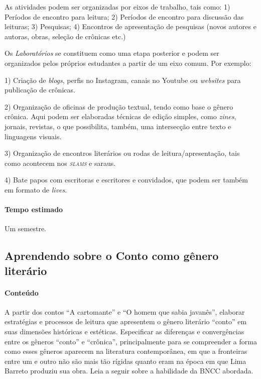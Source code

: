 \documentclass[11pt]{extarticle}
\begin{document}
As atividades podem ser organizadas por eixos de trabalho, tais como: 1)
Períodos de encontro para leitura; 2) Períodos de encontro para
discussão das leituras; 3) Pesquisas; 4) Encontros de apresentação de
pesquisas (novos autores e autoras, obras, seleção de crônicas etc.)

Os \textit{Laboratórios} se constituem como uma etapa posterior e podem
ser organizados pelos próprios estudantes a partir de um eixo comum. Por
exemplo: 

1) Criação de \emph{blogs}, perfis no Instagram, canais no
Youtube ou \emph{websites} para publicação de crônicas. 

2) Organização
de oficinas de produção textual, tendo como base o gênero crônica. Aqui
podem ser elaboradas técnicas de edição simples, como \emph{zines},
jornais, revistas, o que possibilita, também, uma intersecção entre
texto e linguagens visuais. 

3) Organização de encontros literários ou
rodas de leitura/apresentação, tais como acontecem nos \emph{\textsc{slams}} e saraus.

 4) Bate papos com escritoras e escritores e convidados, que podem
ser também em formato de \emph{lives}.


\paragraph{Tempo estimado} Um semestre.

\subsection{Aprendendo sobre o Conto como gênero literário}

\paragraph{Conteúdo} A partir dos contos ``A cartomante'' e
``O homem que sabia javanês'', elaborar estratégias e
processos de leitura que apresentem o gênero literário ``conto'' em suas
dimensões históricas e estéticas. Especificar as diferenças e
convergências entre os gêneros ``conto'' e ``crônica'', principalmente
para se compreender a forma como esses gêneros aparecem na literatura
contemporânea, em que a fronteiras entre um e outro não são mais tão
rígidas quanto eram na época em que Lima Barreto produziu sua obra.
Leia a seguir sobre a habilidade da BNCC abordada.
\end{document}
